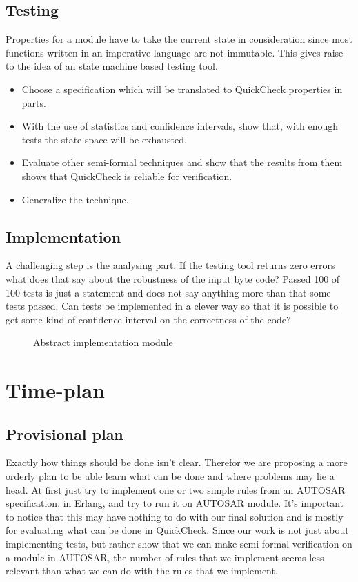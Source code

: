 \documentclass[11pt,a4paper]{report}
\begin{document}
\section{Testing}
Properties for a module have to take the current state in consideration since
most functions written in an imperative language are not immutable. This gives
raise to the idea of an state machine based testing tool.
\begin{itemize}
\item Choose a specification which will be translated to QuickCheck properties
in parts.
\item With the use of statistics and confidence intervals, show that, with
enough tests the state-space will be exhausted.
\item Evaluate other semi-formal techniques and show that the results from them
shows that QuickCheck is reliable for verification.
\item Generalize the technique.
\end{itemize}

\section{Implementation}
A challenging step is the analysing part. If the testing tool returns zero
errors what does that say about the robustness of the input byte code? Passed
100 of 100 tests is just a statement and does not say anything more than that
some tests passed. Can tests be implemented in a clever way so that it is
possible to get some kind of confidence interval on the correctness of the code?
\begin{figure}[!ht]

\caption{Abstract implementation module}
\end{figure}

\chapter{Time-plan}
\section{Provisional plan}
Exactly how things should be done isn't clear. Therefor we are proposing a more
orderly plan to be able learn what can be done and where problems may lie a
head. At first just try to implement one or two simple rules from an AUTOSAR
specification, in Erlang, and try to run it on AUTOSAR module. It's important to
notice that this may have nothing to do with our final solution and is mostly
for evaluating what can be done in QuickCheck. Since our work is not just about
implementing tests, but rather show that we can make semi formal verification on
a module in AUTOSAR, the number of rules that we implement seems less relevant
than what we can do with the rules that we implement.
\end{document}
